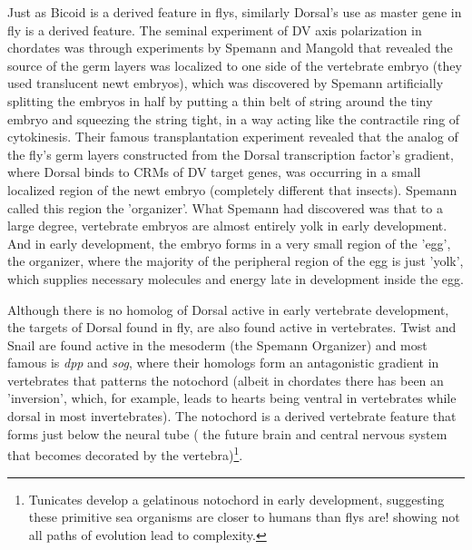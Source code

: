 
Just as Bicoid is a derived feature in flys, similarly Dorsal's use as master gene in fly is a derived feature.  The seminal experiment of DV axis polarization in chordates was through experiments by Spemann and Mangold that revealed the source of the germ layers was localized to one side of the vertebrate embryo (they used translucent newt embryos), which was discovered by Spemann artificially splitting the embryos in half by putting a thin belt of string around the tiny embryo and squeezing the string tight, in a way acting like the contractile ring of cytokinesis\cite{devogilbert}.  Their famous transplantation experiment revealed that the analog of the fly's germ layers constructed from the Dorsal transcription factor's gradient, where Dorsal binds to CRMs of DV target genes, was occurring in a small localized region of the newt embryo (completely different that insects).  Spemann called this region the 'organizer'.  What Spemann had discovered was that to a large degree, vertebrate embryos are almost entirely yolk in early development.  And in early development, the embryo forms in a very small region of the 'egg', the organizer, where the majority of the peripheral region of the egg is just 'yolk', which supplies necessary molecules and energy late in development inside the egg.   

Although there is no homolog of Dorsal active in early vertebrate development, the targets of Dorsal found in fly, are also found active in vertebrates.  Twist and Snail are found active in the mesoderm (the Spemann Organizer) and most famous is \textit{dpp} and \textit{sog}, where their homologs form an antagonistic gradient in vertebrates that patterns the notochord (albeit in chordates there has been an 'inversion', which, for example, leads to hearts being ventral in vertebrates while dorsal in most invertebrates).  The notochord is a derived vertebrate feature that forms just below the neural tube ( the future brain and central nervous system that becomes decorated by the vertebra)\footnote{Tunicates develop a gelatinous notochord in early development, suggesting these primitive sea organisms are closer to humans than flys are! showing not all paths of evolution lead to complexity.}. 

